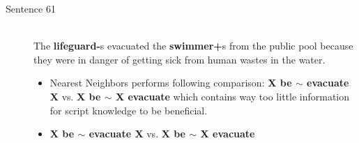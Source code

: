 \documentclass{scrartcl}
\begin{document}
\begin{description}
  \item[Sentence 61] \hfill \\
  The {\bf lifeguard-}s evacuated the {\bf swimmer+}s from the public pool because they were in danger of getting sick from human wastes in the water.
  \begin{itemize}
  	\item Nearest Neighbors performs following comparison: {\bf X be $\sim$ evacuate X} vs. {\bf X be $\sim$ X evacuate} which contains way too little information for script knowledge to be beneficial.
  	\item {\bf X be $\sim$ evacuate X} vs. {\bf X be $\sim$ X evacuate}
  \end{itemize}


\end{description}

\end{document}
